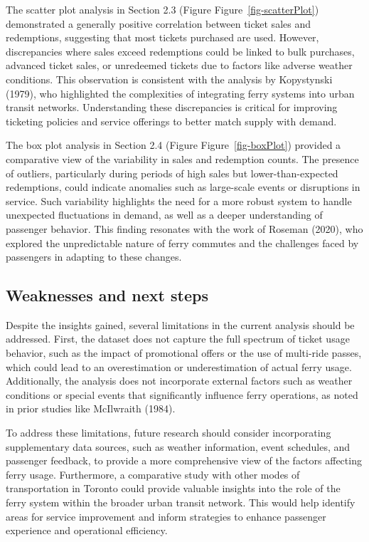 \documentclass[
  letterpaper,
  DIV=11,
  numbers=noendperiod]{scrartcl}
\begin{document}
The scatter plot analysis in Section 2.3 (Figure
Figure~\ref{fig-scatterPlot}) demonstrated a generally positive
correlation between ticket sales and redemptions, suggesting that most
tickets purchased are used. However, discrepancies where sales exceed
redemptions could be linked to bulk purchases, advanced ticket sales, or
unredeemed tickets due to factors like adverse weather conditions. This
observation is consistent with the analysis by Kopystynski (1979), who
highlighted the complexities of integrating ferry systems into urban
transit networks. Understanding these discrepancies is critical for
improving ticketing policies and service offerings to better match
supply with demand.

The box plot analysis in Section 2.4 (Figure Figure~\ref{fig-boxPlot})
provided a comparative view of the variability in sales and redemption
counts. The presence of outliers, particularly during periods of high
sales but lower-than-expected redemptions, could indicate anomalies such
as large-scale events or disruptions in service. Such variability
highlights the need for a more robust system to handle unexpected
fluctuations in demand, as well as a deeper understanding of passenger
behavior. This finding resonates with the work of Roseman (2020), who
explored the unpredictable nature of ferry commutes and the challenges
faced by passengers in adapting to these changes.

\subsection{Weaknesses and next steps}\label{weaknesses-and-next-steps}

Despite the insights gained, several limitations in the current analysis
should be addressed. First, the dataset does not capture the full
spectrum of ticket usage behavior, such as the impact of promotional
offers or the use of multi-ride passes, which could lead to an
overestimation or underestimation of actual ferry usage. Additionally,
the analysis does not incorporate external factors such as weather
conditions or special events that significantly influence ferry
operations, as noted in prior studies like McIlwraith (1984).

To address these limitations, future research should consider
incorporating supplementary data sources, such as weather information,
event schedules, and passenger feedback, to provide a more comprehensive
view of the factors affecting ferry usage. Furthermore, a comparative
study with other modes of transportation in Toronto could provide
valuable insights into the role of the ferry system within the broader
urban transit network. This would help identify areas for service
improvement and inform strategies to enhance passenger experience and
operational efficiency.
\end{document}
